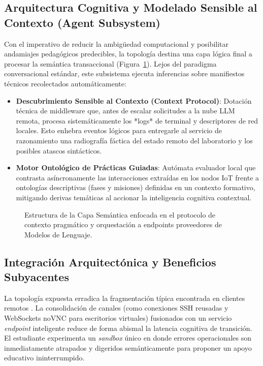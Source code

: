 \documentclass[conference]{IEEEtran} %
\begin{document}
\subsection{Arquitectura Cognitiva y Modelado Sensible al Contexto (Agent Subsystem)}

Con el imperativo de reducir la ambigüedad computacional y posibilitar andamiajes pedagógicos predecibles, la topología destina una capa lógica final a procesar la semántica transaccional (Figura~\ref{fig:subsistema_agente}). Lejos del paradigma conversacional estándar, este subsistema ejecuta inferencias sobre manifiestos técnicos recolectados automáticamente:

\begin{itemize}
    \item \textbf{Descubrimiento Sensible al Contexto (Context Protocol)}: Dotación técnica de middleware que, antes de escalar solicitudes a la nube LLM remota, procesa sistemáticamente los *logs* de terminal y descriptores de red locales. Esto enhebra eventos lógicos para entregarle al servicio de razonamiento una radiografía fáctica del estado remoto del laboratorio y los posibles atascos sintácticos.
    \item \textbf{Motor Ontológico de Prácticas Guiadas}: Autómata evaluador local que contrasta asíncronamente las interacciones extraídas en los nodos IoT frente a ontologías descriptivas (fases y misiones) definidas en un contexto formativo, mitigando derivas temáticas al accionar la inteligencia cognitiva contextual.
\end{itemize}

\begin{figure}[ht]
    \centering
    \caption{Estructura de la Capa Semántica enfocada en el protocolo de contexto pragmático y orquestación a endpoints proveedores de Modelos de Lenguaje.}
    \label{fig:subsistema_agente}
\end{figure}

\subsection{Integración Arquitectónica y Beneficios Subyacentes}

La topología expuesta erradica la fragmentación típica encontrada en clientes remotos \cite{mobaxterm_misc}. La consolidación de canales (como conexiones SSH reusadas y WebSockets noVNC para escritorios virtuales) fusionados con un servicio \textit{endpoint} inteligente reduce de forma abismal la latencia cognitiva de transición. El estudiante experimenta un \textit{sandbox} único en donde errores operacionales son inmediatamente atrapados y digeridos semánticamente para proponer un apoyo educativo ininterrumpido.
\end{document}
